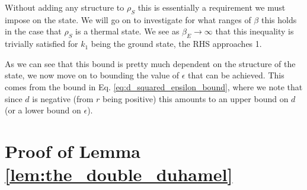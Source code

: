 \documentclass{article}
\begin{document}
Without adding any structure to $\rho_S$ this is essentially a requirement we must impose on the state. We will go on to investigate for what ranges of $\beta$ this holds in the case that $\rho_S$ is a thermal state. We see as $\beta_E \to \infty$ that this inequality is trivially satisfied for $k_1$ being the ground state, the RHS approaches 1.

As we can see that this bound is pretty much dependent on the structure of the state, we now move on to bounding the value of $\epsilon$ that can be achieved. This comes from the bound in Eq. \eqref{eq:d_squared_epsilon_bound}, where we note that since $d$ is negative (from $r$ being positive) this amounts to an upper bound on $d$ (or a lower bound on $\epsilon$).




\appendix
\section{Proof of Lemma \ref{lem:the_double_duhamel}}
\end{document}
